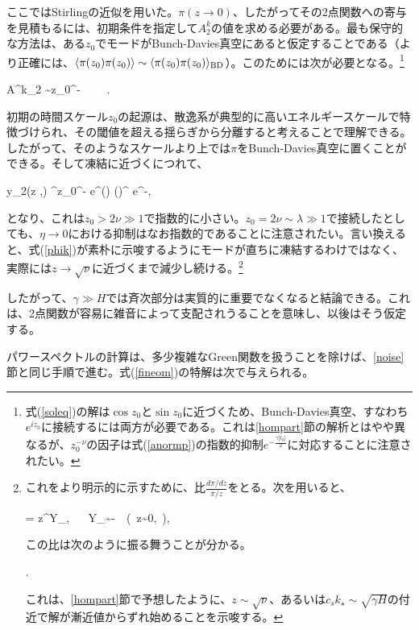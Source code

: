 ここではStirlingの近似を用いた。$\pi(z\to0)$、したがってその2点関数への寄与を見積もるには、初期条件を指定して$A_2^k$の値を求める必要がある。最も保守的な方法は、ある$z_0$でモードがBunch-Davies真空にあると仮定することである（より正確には、$\langle\pi(z_0)\pi(z_0)\rangle\sim\langle\pi(z_0)\pi(z_0)\rangle_{\rm BD}$）。このためには次が必要となる。\footnote{式(\ref{soleq})の解は$\cos z_0$と$\sin z_0$に近づくため、Bunch-Davies真空、すなわち$e^{iz_0}$に接続するには両方が必要である。これは\ref{hompart}節の解析とはやや異なるが、$z_0^{-\nu}$の因子は式(\ref{anormp})の指数的抑制$e^{-\frac{\gamma|t_0|}{2}}$に対応することに注意されたい。}

\beq A^k_2 \sim z_0^{-\nu}~~~~ \nu {}.\eeq

初期の時間スケール$z_0$の起源は、散逸系が典型的に高いエネルギースケールで特徴づけられ、その閾値を超える揺らぎから分離すると考えることで理解できる。したがって、そのようなスケールより上では$\pi$をBunch-Davies真空に置くことができる。そして凍結に近づくにつれて、

\beq
\label{f2z0nu}
y_2(z ,\nu) ^\nu z_0^{-\nu}\sqrt{2\nu} e^{\nu(\log{})} \to \left(\right)^\nu\sqrt{2\nu} e^{-\nu},
\eeq

となり、これは$z_0>2\nu\gg1$で指数的に小さい。$z_0=2\nu\sim\lambda\gg1$で接続したとしても、$\eta\to0$における抑制はなお指数的であることに注意されたい。言い換えると、式(\ref{phik})が素朴に示唆するようにモードが直ちに凍結するわけではなく、実際には$z\to\sqrt{\nu}$に近づくまで減少し続ける。\footnote{これをより明示的に示すために、比$\frac{d\pi/dz}{\pi/z}$をとる。次を用いると、

\beq
{} =  z^\nu Y_{}, ~~ Y_\nu \sim -~~(~z\sim 0,~\nu{}),
\eeq

この比は次のように振る舞うことが分かる。

\beq
{} \simeq {}.
\eeq

これは、\ref{hompart}節で予想したように、$z\sim\sqrt{\nu}$、あるいは$c_sk_\star\sim\sqrt{\gamma H}$の付近で解が漸近値からずれ始めることを示唆する。}

したがって、$\gamma\gg H$では斉次部分は実質的に重要でなくなると結論できる。これは、2点関数が容易に雑音によって支配されうることを意味し、以後はそう仮定する。

\label{power}

パワースペクトルの計算は、多少複雑なGreen関数を扱うことを除けば、\ref{noise}節と同じ手順で進む。式(\ref{fineom})の特解は次で与えられる。

